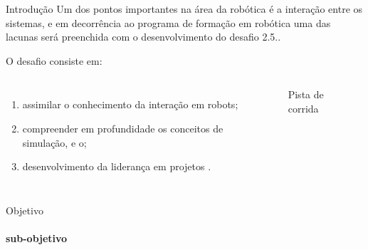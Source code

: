 \begin{frame}[t]{Introdução} 
    \transdissolve[duration=0.5]
    Um dos pontos importantes na área da robótica é a interação entre os sistemas, e em decorrência ao programa de formação em robótica uma das lacunas será preenchida com o desenvolvimento do desafio 2.5..

    O desafio consiste em:
        \begin{columns}[t]
                \begin{enumerate}
                    \item assimilar o conhecimento da interação em robots;
                    \item compreender em profundidade os conceitos de simulação, e o;
                    \item desenvolvimento da liderança em projetos \cite{Mohan2015}.
                \end{enumerate}
            \begin{center}
                \begin{figure}
                    \caption{Pista de corrida \cite{agostini2007}}
                \end{figure}
            \end{center}
        \end{columns}
\end{frame}
\begin{frame}[c]{Objetivo} 
    \framesubtitle{sub-objetivo}
    \transdissolve[duration=0.5]
   
    \begin{center}
    \end{center}
    
   
\end{frame}
